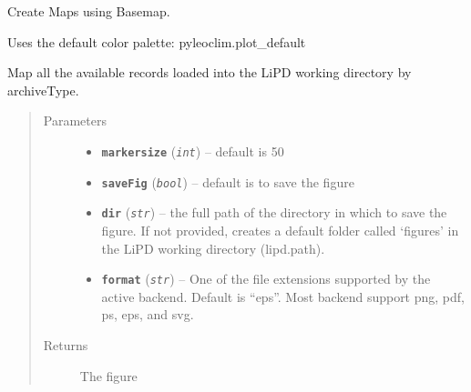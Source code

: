 \documentclass[letterpaper,10pt,english]{sphinxmanual}
\begin{document}
\begin{fulllineitems}
\label{Mapping:pyleoclim.Map}
Create Maps using Basemap.

Uses the default color palette: pyleoclim.plot\_default

\begin{fulllineitems}
\label{Mapping:pyleoclim.Map.map_all}
Map all the available records loaded into the LiPD working directory by archiveType.
\begin{quote}\begin{description}
\item[{Parameters}] \leavevmode\begin{itemize}
\item {} 
\textbf{\texttt{markersize}} (\emph{\texttt{int}}) -- default is 50

\item {} 
\textbf{\texttt{saveFig}} (\emph{\texttt{bool}}) -- default is to save the figure

\item {} 
\textbf{\texttt{dir}} (\emph{\texttt{str}}) -- the full path of the directory in which to save the
figure. If not provided, creates a default folder called
`figures' in the LiPD working directory (lipd.path).

\item {} 
\textbf{\texttt{format}} (\emph{\texttt{str}}) -- One of the file extensions supported by the active
backend. Default is ``eps''. Most backend support png, pdf, ps,
eps, and svg.

\end{itemize}

\item[{Returns}] \leavevmode
The figure

\end{description}\end{quote}

\end{fulllineitems}



\end{fulllineitems}
\end{document}
